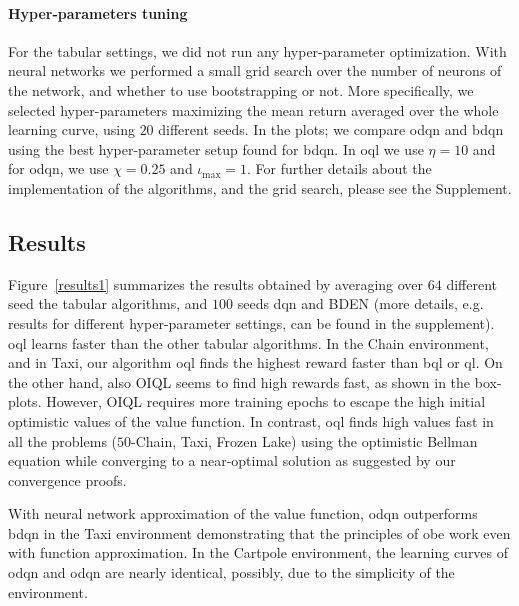 \paragraph{Hyper-parameters tuning} For the tabular settings, we did not run any hyper-parameter optimization. With neural networks we performed a small grid search over the number of neurons of the network, and whether to use bootstrapping or not. More specifically, we selected hyper-parameters maximizing the mean return averaged over the whole learning curve, using $20$ different seeds. In the plots; we compare \gls{odqn} and \gls{bdqn} using the best hyper-parameter setup found for \gls{bdqn}. In \gls{oql} we use $\eta=10$ and for \gls{odqn}, we use $\chi=0.25$ and $\iota_{\max}=1$. For further details about the implementation of the algorithms, and the grid search, please see the Supplement.

\setlength\figureheight{4cm}
\setlength\figurewidth{4cm}
% 	
\subsection{Results}
Figure~\ref{results1} summarizes the results obtained by averaging over $64$ different seed the tabular algorithms, and $100$ seeds \gls{dqn} and BDEN (more details, e.g. results for different hyper-parameter 
settings, can be found in the supplement).
\gls{oql} learns faster than the other tabular algorithms. In the Chain environment, and in Taxi,
our algorithm \gls{oql} finds the highest reward faster than \gls{bql} or \gls{ql}. On the other hand, also OIQL seems to find
high rewards fast, as shown in the box-plots. However, OIQL requires more training epochs to escape the high initial
optimistic values of the value function. In contrast, \gls{oql} finds high values fast in all the problems
($50$-Chain, Taxi, Frozen Lake) using the optimistic Bellman equation
while converging to a near-optimal solution as suggested by our convergence proofs.

With neural network approximation of the value function, \gls{odqn} outperforms \gls{bdqn} in the Taxi environment
demonstrating that the principles of \gls{obe} work even with function approximation. In the Cartpole environment,
the learning curves of \gls{odqn} and \gls{odqn} are nearly identical, possibly, due to the simplicity of the environment.

